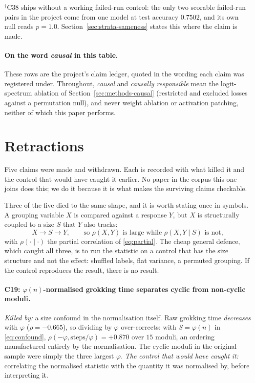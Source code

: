 \noindent
$^{\dagger}$C38 ships without a working failed-run control: the only two scorable
failed-run pairs in the project come from one model at test accuracy $0.7502$, and its own null
reads $p = 1.0$. Section~\ref{sec:strata-sameness} states this where the claim is made.

\paragraph{On the word \emph{causal} in this table.} These rows are the project's claim ledger,
quoted in the wording each claim was registered under. Throughout, \emph{causal} and
\emph{causally responsible} mean the logit-spectrum ablation of
Section~\ref{sec:methods-causal} (restricted and excluded losses against a permutation null),
and never weight ablation or activation patching, neither of which this paper performs.

\section{Retractions}
\label{app:retractions}

Five claims were made and withdrawn. Each is recorded with what killed it and the control that
would have caught it earlier. No paper in the corpus this one joins does this; we do it because
it is what makes the surviving claims checkable.

Three of the five died to the same shape, and it is worth stating once in symbols. A grouping
variable $X$ is compared against a response $Y$, but $X$ is structurally coupled to a size $S$
that $Y$ also tracks:
\begin{equation}
  \label{eq:confound}
  X \longrightarrow S \longrightarrow Y,
  \qquad\text{so } \rho(X, Y) \text{ is large while } \rho(X, Y \mid S) \text{ is not,}
\end{equation}
with $\rho(\cdot \mid \cdot)$ the partial correlation of \eqref{eq:partial}. The cheap general
defence, which caught all three, is to run the statistic on a control that has the size
structure and not the effect: shuffled labels, flat variance, a permuted grouping. If the
control reproduces the result, there is no result.

\paragraph{C19: $\varphi(n)$-normalised grokking time separates cyclic from non-cyclic
moduli.} \emph{Killed by:} a size confound in the normalisation itself. Raw grokking time
\emph{decreases} with $\varphi$ ($\rho = -0.665$), so dividing by $\varphi$ over-corrects: with
$S = \varphi(n)$ in \eqref{eq:confound}, $\rho(-\varphi, \text{steps}/\varphi) = +0.870$ over
$15$ moduli, an ordering manufactured entirely by the normalisation. The
cyclic moduli in the original sample were simply the three largest $\varphi$. \emph{The control
that would have caught it:} correlating the normalised statistic with the quantity it was
normalised by, before interpreting it.

